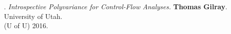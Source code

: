 \paper. \textit{Introspective Polyvariance for Control-Flow Analyses.}
\textbf{Thomas Gilray}.
University of Utah.
\\(U of U) 2016.
\\ \vspace{-0.1cm}\\
